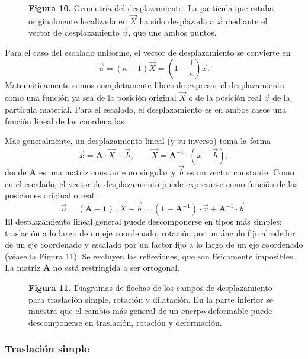 \begin{figure}[H]
\centering

\par\medskip
\textbf{Figura 10.} Geometría del desplazamiento. La partícula que estaba originalmente localizada en $\vec{X}$ ha sido desplazada a $\vec{x}$ mediante el vector de desplazamiento $\vec{u}$, que une ambos puntos.
\end{figure}
Para el caso del escalado uniforme, el vector de desplazamiento se convierte en
\[ \vec{u} = (\kappa - 1)\vec{X} = \left(1 - \frac{1}{\kappa}\right)\vec{x}. \]
Matemáticamente somos completamente libres de expresar el desplazamiento como una función ya sea de la posición original $\vec{X}$ o de la posición real $\vec{x}$ de la partícula material. Para el escalado, el desplazamiento es en ambos casos una función lineal de las coordenadas.

Más generalmente, un desplazamiento lineal (y su inverso) toma la forma
\[ \vec{x} = \mathbf{A}\cdot\vec{X} + \vec{b}, \qquad \vec{X} = \mathbf{A}^{-1}\cdot\left(\vec{x} - \vec{b}\right), \]
donde $\mathbf{A}$ es una matriz constante no singular y $\vec{b}$ es un vector constante. Como en el escalado, el vector de desplazamiento puede expresarse como función de las posiciones original o real:
\[ \vec{u} = (\mathbf{A} - \mathbf{1})\cdot\vec{X} + \vec{b} = \left(\mathbf{1} - \mathbf{A}^{-1}\right)\cdot\vec{x} + \mathbf{A}^{-1}\cdot\vec{b}. \]
El desplazamiento lineal general puede descomponerse en tipos más simples: traslación a lo largo de un eje coordenado, rotación por un ángulo fijo alrededor de un eje coordenado y escalado por un factor fijo a lo largo de un eje coordenado (véase la Figura 11). Se excluyen las reflexiones, que son físicamente imposibles. La matriz $\mathbf{A}$ no está restringida a ser ortogonal.

\begin{figure}[H]
\centering

\par\medskip
\textbf{Figura 11.} Diagramas de flechas de los campos de desplazamiento para traslación simple, rotación y dilatación. En la parte inferior se muestra que el cambio más general de un cuerpo deformable puede descomponerse en traslación, rotación y deformación.
\end{figure}

\subsubsection{Traslación simple}

